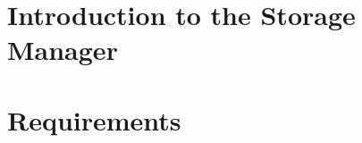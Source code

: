 \documentclass{cmspaper}
\begin{document}
\section{Introduction to the Storage Manager}



\section{Requirements}














\pagebreak


%
%
 

\pagebreak

\end{document}
